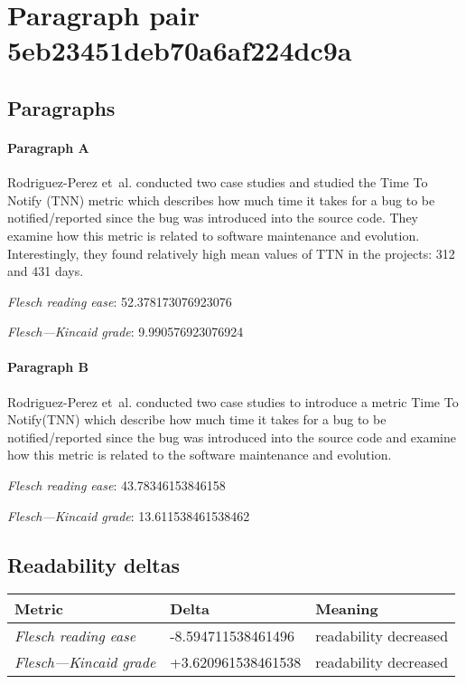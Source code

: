 \section{Paragraph pair 5eb23451deb70a6af224dc9a}
\subsection{Paragraphs}
\paragraph{Paragraph A}
Rodriguez-Perez et al. conducted two case studies and studied the Time To Notify (TNN) metric which describes how much time it takes for a bug to be notified/reported since the bug was introduced into the source code. They examine how this metric is related to software maintenance and evolution. Interestingly, they found relatively high mean values of TTN in the projects: 312 and 431 days.\par\medskip\emph{Flesch reading ease}: 52.378173076923076\par\emph{Flesch---Kincaid grade}: 9.990576923076924

\paragraph{Paragraph B}
Rodriguez-Perez et al. conducted two case studies to introduce a metric Time To Notify(TNN) which describe how much time it takes for a bug to be notified/reported since the bug was introduced into the source code and examine how this metric is related to the software maintenance and evolution.\par\medskip\emph{Flesch reading ease}: 43.78346153846158\par\emph{Flesch---Kincaid grade}: 13.611538461538462

\subsection{Readability deltas}

\begin{tabular}{lll}
\toprule
               \textbf{Metric} &      \textbf{Delta} &       \textbf{Meaning} \\
\midrule
    \emph{Flesch reading ease} &  -8.594711538461496 &  readability decreased \\
 \emph{Flesch---Kincaid grade} &  +3.620961538461538 &  readability decreased \\
\bottomrule
\end{tabular}

